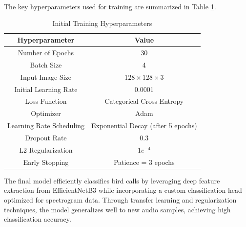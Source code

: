 \begin{itemize}
            The key hyperparameters used for training are summarized in Table \ref{tab:training_hyperparameters}.
            \begin{table}[h]
                  \centering
                  \caption{Initial Training Hyperparameters}
                  \label{tab:training_hyperparameters}
                  \begin{tabular}{|c|c|}
                  \hline
                  \textbf{Hyperparameter} & \textbf{Value} \\
                  \hline
                  Number of Epochs & 30 \\
                  \hline
                  Batch Size & 4 \\
                  \hline
                  Input Image Size & \(128 \times 128 \times 3\) \\
                  \hline
                  Initial Learning Rate & 0.0001 \\
                  \hline
                  Loss Function & Categorical Cross-Entropy \\
                  \hline
                  Optimizer & Adam \\
                  \hline
                  Learning Rate Scheduling & Exponential Decay (after 5 epochs) \\
                  \hline
                  Dropout Rate & 0.3 \\
                  \hline
                  L2 Regularization & \(1e^{-4}\) \\
                  Early Stopping & Patience = 3 epochs \\
                  \hline
                  \end{tabular}
            \end{table}
            
            
            The final model efficiently classifies bird calls by leveraging deep feature extraction from EfficientNetB3 while incorporating a custom classification head optimized for spectrogram data. Through transfer learning and regularization techniques, the model generalizes well to new audio samples, achieving high classification accuracy.
      \end{itemize}


